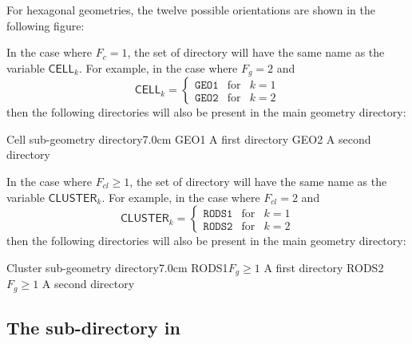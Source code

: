 For hexagonal geometries, the twelve
possible orientations are shown in the following figure:

\begin{center} 
\epsfxsize=10cm
\centerline{ }
\end{center}

In the case where $F_{c}=1$, the set of directory  will have the
same name as the variable $\mathsf{CELL}_{k}$. For example, in the case where
$F_{g}=2$ and
\begin{displaymath}
\mathsf{CELL}_{k} = \left\{
\begin{array}{lll}
\mathtt{GEO1} & \textrm{for} & k=1\\
\mathtt{GEO2} & \textrm{for} & k=2
\end{array} \right.
\end{displaymath}
then
the following directories will also be present in the main geometry directory:

\begin{DescriptionEnregistrement}{Cell sub-geometry directory}{7.0cm}
\DirEnr
  {GEO1}
  {A first  directory}
\DirEnr
  {GEO2}
  {A second  directory}
\end{DescriptionEnregistrement}

In the case where $F_{cl}\ge1$, the set of directory  will have the
same name as the variable $\mathsf{CLUSTER}_{k}$. For example, in the case where
$F_{cl}=2$ and
\begin{displaymath}
\mathsf{CLUSTER}_{k} = \left\{
\begin{array}{lll}
\mathtt{RODS1} & \textrm{for} & k=1\\
\mathtt{RODS2} & \textrm{for} & k=2
\end{array} \right.
\end{displaymath}
then
the following directories will also be present in the main geometry directory:

\begin{DescriptionEnregistrement}{Cluster sub-geometry directory}{7.0cm}
\OptDirEnr
  {RODS1}{$F_{g}\ge 1$}
  {A first  directory}
\OptDirEnr
  {RODS2}{$F_{g}\ge 1$}
  {A second  directory}
\end{DescriptionEnregistrement}

\subsection{The  sub-directory in }\label{sect:geometrybihet}

